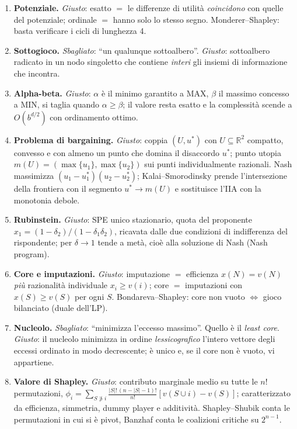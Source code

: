 \documentclass[12pt,a4paper,twoside]{book}
\theoremstyle{plain}
\theoremstyle{definition}
\begin{document}
\begin{enumerate}[leftmargin=*]
        altrui a cui $s_i$ sia best response. Il quantificatore è su tutte le
        credenze, non solo sulle pure.
  \item \textbf{Potenziale.}
        \emph{Giusto}: esatto $=$ le differenze di utilità \emph{coincidono} con
        quelle del potenziale; ordinale $=$ hanno solo lo stesso segno.
        Monderer--Shapley: basta verificare i cicli di lunghezza 4.
  \item \textbf{Sottogioco.}
        \emph{Sbagliato}: ``un qualunque sottoalbero''.
        \emph{Giusto}: sottoalbero radicato in un nodo singoletto che contiene
        \emph{interi} gli insiemi di informazione che incontra.
  \item \textbf{Alpha-beta.}
        \emph{Giusto}: $\alpha$ è il minimo garantito a MAX, $\beta$ il massimo
        concesso a MIN, si taglia quando $\alpha\ge\beta$; il valore resta esatto e
        la complessità scende a $O(b^{d/2})$ con ordinamento ottimo.
  \item \textbf{Problema di bargaining.}
        \emph{Giusto}: coppia $(U,u^*)$ con $U\subseteq\mathbb{R}^2$ compatto,
        convesso e con almeno un punto che domina il disaccordo $u^*$; punto utopia
        $m(U)=(\max\{u_1\},\max\{u_2\})$ sui punti individualmente razionali.
        Nash massimizza $(u_1-u^*_1)(u_2-u^*_2)$; Kalai--Smorodinsky prende
        l'intersezione della frontiera con il segmento $u^*\to m(U)$ e sostituisce
        l'IIA con la monotonia debole.
  \item \textbf{Rubinstein.}
        \emph{Giusto}: SPE unico stazionario, quota del proponente
        $x_1=(1-\delta_2)/(1-\delta_1\delta_2)$, ricavata dalle due condizioni di
        indifferenza del rispondente; per $\delta\to 1$ tende a metà, cioè alla
        soluzione di Nash (Nash program).
  \item \textbf{Core e imputazioni.}
        \emph{Giusto}: imputazione $=$ efficienza $x(N)=v(N)$ \emph{più} razionalità
        individuale $x_i\ge v(i)$; core $=$ imputazioni con $x(S)\ge v(S)$ per ogni
        $S$. Bondareva--Shapley: core non vuoto $\iff$ gioco bilanciato (duale dell'LP).
  \item \textbf{Nucleolo.}
        \emph{Sbagliato}: ``minimizza l'eccesso massimo''. Quello è il \emph{least core}.
        \emph{Giusto}: il nucleolo minimizza in ordine \emph{lessicografico} l'intero
        vettore degli eccessi ordinato in modo decrescente; è unico e, se il core non
        è vuoto, vi appartiene.
  \item \textbf{Valore di Shapley.}
        \emph{Giusto}: contributo marginale medio su tutte le $n!$ permutazioni,
        $\phi_i=\sum_{S\not\ni i}\frac{|S|!\,(n-|S|-1)!}{n!}[v(S\cup i)-v(S)]$;
        caratterizzato da efficienza, simmetria, dummy player e additività.
        Shapley--Shubik conta le permutazioni in cui si è pivot, Banzhaf conta le
        coalizioni critiche su $2^{n-1}$.
\end{enumerate}

\backmatter
\end{document}

